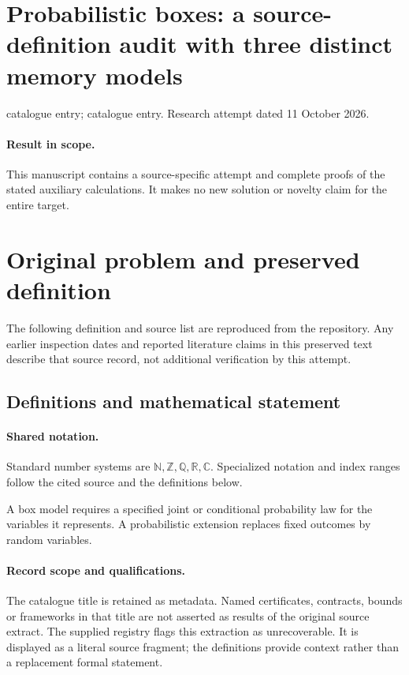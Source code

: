 \documentclass[11pt]{article}
\begin{document}
\section*{Probabilistic boxes: a source-definition audit with three distinct memory models}
\noindent catalogue entry; catalogue entry. Research attempt dated 11 October 2026.
\paragraph{Result in scope.}This manuscript contains a source-specific attempt and complete proofs of the stated auxiliary calculations. It makes no new solution or novelty claim for the entire target.
\section{Original problem and preserved definition}
The following definition and source list are reproduced from the repository. Any earlier inspection dates and reported literature claims in this preserved text describe that source record, not additional verification by this attempt.
\subsection{Definitions and mathematical statement}

\paragraph{Shared notation.}Standard number systems are $\mathbb N,\mathbb Z,\mathbb Q,\mathbb R,\mathbb C$. Specialized notation and index ranges follow the cited source and the definitions below.


A box model requires a specified joint or conditional probability law for the variables it represents. A probabilistic extension replaces fixed outcomes by random variables.
\paragraph{Record scope and qualifications.}
The catalogue title is retained as metadata. Named certificates, contracts, bounds or frameworks in that title are not asserted as results of the original source extract.
The supplied registry flags this extraction as unrecoverable. It is displayed as a literal source fragment; the definitions provide context rather than a replacement formal statement.
\end{document}
